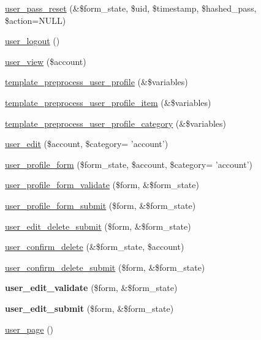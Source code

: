 \begin{CompactItemize}
\item 
\hyperlink{user_8pages_8inc_b0f668164fa4eb84a181a32eb4d3a57f}{user\_\-pass\_\-reset} (\&\$form\_\-state, \$uid, \$timestamp, \$hashed\_\-pass, \$action=NULL)
\item 
\hyperlink{user_8pages_8inc_239a2e50f18165d4a8b4c8bd3917466e}{user\_\-logout} ()
\item 
\hyperlink{user_8pages_8inc_f70d615c07069b8c6c9c68c1c3e132f7}{user\_\-view} (\$account)
\item 
\hyperlink{user_8pages_8inc_5a1229a0cb26128b7efab80c025e2d75}{template\_\-preprocess\_\-user\_\-profile} (\&\$variables)
\item 
\hyperlink{user_8pages_8inc_b6e6ed16b5647c626cc0468506abd3e9}{template\_\-preprocess\_\-user\_\-profile\_\-item} (\&\$variables)
\item 
\hyperlink{user_8pages_8inc_0b8961894318ad623017b48569515d4a}{template\_\-preprocess\_\-user\_\-profile\_\-category} (\&\$variables)
\item 
\hyperlink{group__forms_gd1dd92a806e43b841305962c7331818b}{user\_\-edit} (\$account, \$category= 'account')
\item 
\hyperlink{group__forms_g7e8a3661add00171d560bec439570fd7}{user\_\-profile\_\-form} (\$form\_\-state, \$account, \$category= 'account')
\item 
\hyperlink{user_8pages_8inc_fca5f516f0fadcb918e6d13dff66db76}{user\_\-profile\_\-form\_\-validate} (\$form, \&\$form\_\-state)
\item 
\hyperlink{user_8pages_8inc_c10455f162f61cbf551fe7ec7b5c92cc}{user\_\-profile\_\-form\_\-submit} (\$form, \&\$form\_\-state)
\item 
\hyperlink{user_8pages_8inc_13c3ecd9255448bd605fcd4ee0daa294}{user\_\-edit\_\-delete\_\-submit} (\$form, \&\$form\_\-state)
\item 
\hyperlink{group__forms_gd250319bfea19c155bc374bad024be1a}{user\_\-confirm\_\-delete} (\&\$form\_\-state, \$account)
\item 
\hyperlink{user_8pages_8inc_462a20e1dc458d7fd3f0a3214863d46f}{user\_\-confirm\_\-delete\_\-submit} (\$form, \&\$form\_\-state)
\item 
\hypertarget{user_8pages_8inc_95517820decd18bee7ff2e614888cd72}{
\textbf{user\_\-edit\_\-validate} (\$form, \&\$form\_\-state)}
\label{user_8pages_8inc_95517820decd18bee7ff2e614888cd72}

\item 
\hypertarget{user_8pages_8inc_23834f105a8877cbf513ba05210e1380}{
\textbf{user\_\-edit\_\-submit} (\$form, \&\$form\_\-state)}
\label{user_8pages_8inc_23834f105a8877cbf513ba05210e1380}

\item 
\hyperlink{user_8pages_8inc_ac56f8d931a31fe423974228cec2cf57}{user\_\-page} ()
\end{CompactItemize}


